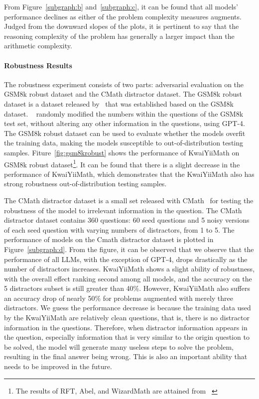 \documentclass{article}
\begin{document}
From Figure~\ref{subgraph:b} and~\ref{subgraph:c}, it can be found that all models’ performance declines as either of the problem complexity measures augments.
Judged from the downward slopes of the plots, it is pertinent to say that the reasoning complexity of the problem has generally a larger impact than the arithmetic complexity.

\paragraph{Robustness Results}
The robustness experiment consists of two parts: adversarial evaluation on the GSM8k robust dataset and the CMath distractor dataset. 
The GSM8k robust dataset is a dataset released by~\cite{abel} that was established based on the GSM8k dataset. 
~\cite{abel} randomly modified the numbers within the questions of the GSM8k test set, without altering any other information in the questions, using GPT-4. 
The GSM8k robust dataset can be used to evaluate whether the models overfit the training data, making the models susceptible to out-of-distribution testing samples.
Fiture~\ref{fig:gsm8krobust} shows the performance of KwaiYiiMath on GSM8k robust dataset\footnote{The results of RFT, Abel, and WizardMath are attained from ~\cite{abel}}.
It can be found that there is a slight decrease in the performance of KwaiYiiMath, which demonstrates that the KwaiYiiMath also has strong robustness out-of-distribution testing samples.

The  CMath distractor dataset is a small set released with CMath~\cite{wei2023cmath} for testing the robustness of the model to irrelevant information in the question.
The CMath distractor dataset contains 360 questions: 60 seed questions and 5 noisy versions of each seed question with varying numbers of distractors, from 1 to 5.
The performance of models on the Cmath distractor dataset is plotted in Figure~\ref{subgraph:d}.
From the figure, it can be observed that we observe that the performance of all LLMs, with the exception of GPT-4, drops drastically as the number of distractors increases.
KwaiYiiMath shows a slight ability of robustness, with the overall effect ranking second among all models, and the accuracy on the 5 distractors subset is still greater than 40\%.
However, KwaiYiiMath also suffers an accuracy drop of nearly 50\% for problems augmented with merely three distractors.
We guess the performance decrease is because the training data used by the KwaiYiiMath are relatively clean questions, that is, there is no distractor information in the questions.
Therefore, when distractor information appears in the question, especially information that is very similar to the origin question to be solved, the model will generate many useless steps to solve the problem, resulting in the final answer being wrong.
This is also an important ability that needs to be improved in the future.
\end{document}
